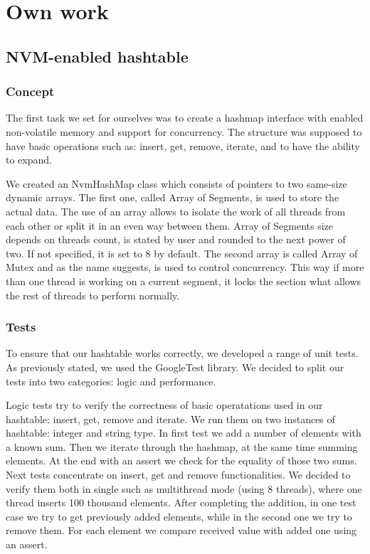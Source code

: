 
\chapter{Own work}

\section{NVM-enabled hashtable}

\subsection{Concept}

    The first task we set for ourselves was to create a hashmap interface with enabled non-volatile memory and support for concurrency. The structure was supposed to have basic operations such as: insert, get, remove, iterate, and to have the ability to expand. 
    
    We created an NvmHashMap class which consists of pointers to two same-size dynamic arrays. The first one, called Array of Segments, is used to store the actual data. The use of an array allows to isolate the work of all threads from each other or split it in an even way between them. Array of Segments size depends on threads count, is stated by user and rounded to the next power of two. If not specified, it is set to 8 by default. The second array is called Array of Mutex and as the name suggests, is used to control concurrency. This way if more than one thread is working on a current segment, it locks the section what allows the rest of threads to perform normally. 
    

\subsection{Tests}

    To ensure that our hashtable works correctly, we developed a range of unit tests. As previously stated, we used the GoogleTest library. We decided to split our tests into two categories: logic and performance.
    
    Logic tests try to verify the correctness of basic operatations used in our hashtable: insert, get, remove and iterate. We run them on two instances of hashtable: integer and string type. In first test we add a number of elements with a known sum. Then we iterate through the hashmap, at the same time summing elements. At the end with an assert we check for the equality of those two sums. Next tests concentrate on insert, get and remove functionalities. We decided to verify them both in single such as multithread mode (using 8 threads), where one thread inserts 100 thousand elements. After completing the addition, in one test case we try to get previously added elements, while in the second one we try to remove them. For each element we compare received value with added one using an assert.
    
